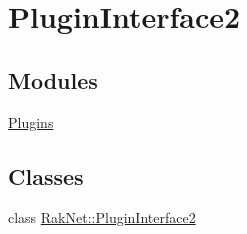 \hypertarget{group___p_l_u_g_i_n___i_n_t_e_r_f_a_c_e___g_r_o_u_p}{\section{Plugin\-Interface2}
\label{group___p_l_u_g_i_n___i_n_t_e_r_f_a_c_e___g_r_o_u_p}
}
\subsection*{Modules}
\begin{DoxyCompactItemize}
\item 
\hyperlink{group___p_l_u_g_i_n_s___g_r_o_u_p}{Plugins}
\end{DoxyCompactItemize}
\subsection*{Classes}
\begin{DoxyCompactItemize}
\item 
class \hyperlink{class_rak_net_1_1_plugin_interface2}{Rak\-Net\-::\-Plugin\-Interface2}
\end{DoxyCompactItemize}
